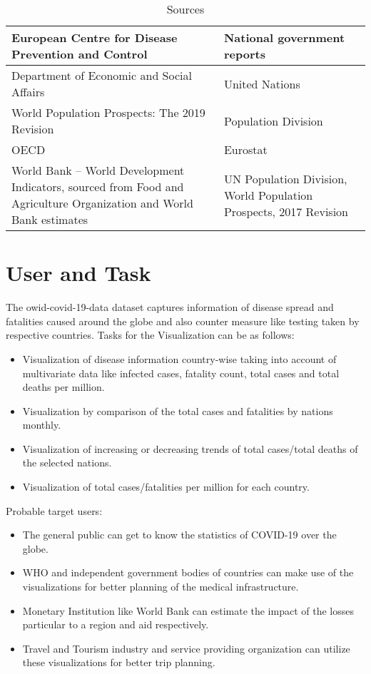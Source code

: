 \documentclass[10pt]{article}
\begin{document}
\begin{table}[htbp]
    \centering
    \begin{tabular}{|p{6cm}|p{6cm}|}
        \hline
        European Centre for Disease Prevention and Control &  National government reports \\
        \hline 
        Department of Economic and Social Affairs & United Nations \\
        \hline
        World Population Prospects: The 2019 Revision & Population Division \\
        \hline 
        OECD & Eurostat \\
        \hline
        World Bank – World Development Indicators, sourced from Food and Agriculture Organization and World Bank estimates &  UN Population Division, World Population Prospects, 2017 Revision\\
        \hline
    \end{tabular}
	\caption{Sources}
	\label{tab:data_sources}
\end{table}




\section{User and Task}
The owid-covid-19-data dataset captures information of disease spread and fatalities caused around the globe and also counter measure like testing taken by respective countries.\newline
Tasks for the Visualization can be as follows:
\begin{itemize}
    \item Visualization of disease information country-wise taking into account of multivariate data like infected cases, fatality count, total cases and total deaths per million.
    \item Visualization by comparison of the total cases and fatalities by nations monthly.
    \item Visualization of increasing or decreasing trends of total cases/total deaths of the selected nations.
    \item Visualization of total cases/fatalities per million for each country.
\end{itemize}
Probable target users:
\begin{itemize}
    \item The general public can get to know the statistics of COVID-19 over the globe. 
    \item WHO and independent government bodies of countries can make use of the visualizations for better planning of the medical infrastructure. 
    \item Monetary Institution like World Bank can estimate the impact of the losses particular to a region and aid respectively.
    \item Travel and Tourism industry and service providing organization can utilize these visualizations for better trip planning.
\end{itemize}
\end{document}
